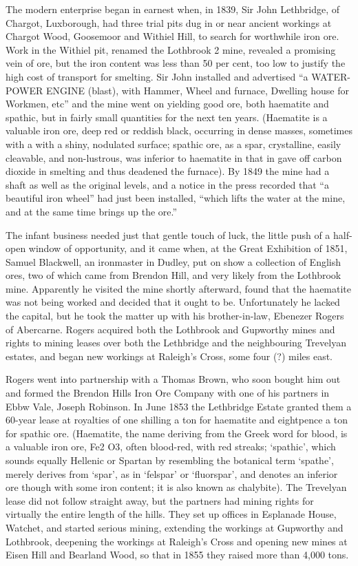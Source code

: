 \documentclass[11pt]{book}
\begin{document}
The modern enterprise began in earnest when, in 1839, Sir John Lethbridge, of Chargot, Luxborough, had three trial pits dug in or near ancient workings  at Chargot Wood, Goosemoor and Withiel Hill, to search for worthwhile iron ore. Work in the  Withiel pit, renamed the Lothbrook 2 mine, revealed a promising vein of ore, but the iron content was  less than 50 per cent, too low to justify the high cost of transport for smelting. Sir John installed and advertised “a WATER-POWER ENGINE (blast), with Hammer, Wheel and furnace, Dwelling house for Workmen, etc” and the mine went on yielding good ore, both haematite and spathic,  but in fairly small quantities for the next ten years. (Haematite is a valuable iron ore, deep red or reddish black, occurring in dense masses, sometimes with a with a shiny, nodulated surface; spathic ore, as a spar, crystalline, easily cleavable, and non-lustrous, was inferior to haematite in that in gave off carbon dioxide in smelting and thus deadened the furnace). By 1849 the mine had a shaft as well as the original levels, and a notice in the press recorded that “a beautiful iron wheel” had just been installed, “which lifts the water at the mine, and at the same time brings up the ore.”

The infant business needed just that gentle touch of luck, the little push of a half-open window of opportunity, and it came when, at the Great Exhibition of 1851, Samuel Blackwell, an ironmaster in Dudley, put on show a collection of English ores, two of which came from Brendon Hill, and very likely from the Lothbrook mine. Apparently he visited the mine shortly afterward, found that the haematite was not being worked and decided that it ought to be. Unfortunately he lacked the capital, but he took the matter up with his brother-in-law, Ebenezer Rogers of Abercarne. Rogers acquired both the Lothbrook and Gupworthy mines and rights to mining leases over both the Lethbridge and the neighbouring Trevelyan estates, and began new workings at Raleigh’s Cross, some four (?) miles east.

Rogers went into partnership with a Thomas Brown, who soon bought him out and formed the Brendon Hills Iron Ore Company with one of his partners in Ebbw Vale, Joseph Robinson. In June 1853 the Lethbridge Estate granted them a 60-year lease at royalties of one shilling a ton for haematite and eightpence a ton for spathic ore. (Haematite, the name deriving from the Greek word for blood, is a valuable iron ore, Fe2 O3, often blood-red, with red streaks;  ‘spathic’, which sounds equally Hellenic or Spartan by resembling the botanical term ‘spathe’,   merely derives from ‘spar’, as in ‘felspar’ or ‘fluorspar’, and denotes an inferior ore though with some iron content; it is also known as chalybite). The Trevelyan lease did not follow straight away, but the partners had mining rights for virtually the entire length of the hills. They set up offices in Esplanade House, Watchet, and started serious mining, extending the workings at Gupworthy and Lothbrook, deepening the workings at Raleigh’s Cross and opening new mines at Eisen Hill and Bearland Wood, so that in 1855 they raised more than 4,000 tons.
\end{document}
